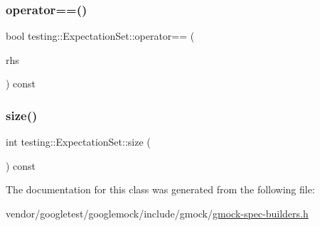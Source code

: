 \mbox{\label{classtesting_1_1_expectation_set_a0c628ffa2d255f56ca09fd739d5765db}} 
\subsubsection{\texorpdfstring{operator==()}{operator==()}}
{\footnotesize\ttfamily bool testing\+::\+Expectation\+Set\+::operator== (\begin{DoxyParamCaption}\item[{const \hyperlink{classtesting_1_1_expectation_set}{Expectation\+Set} \&}]{rhs }\end{DoxyParamCaption}) const\hspace{0.3cm}{\ttfamily [inline]}}

\mbox{\label{classtesting_1_1_expectation_set_a0941a29f03582a20c5eeabb5bf095f49}} 
\subsubsection{\texorpdfstring{size()}{size()}}
{\footnotesize\ttfamily int testing\+::\+Expectation\+Set\+::size (\begin{DoxyParamCaption}{ }\end{DoxyParamCaption}) const\hspace{0.3cm}{\ttfamily [inline]}}



The documentation for this class was generated from the following file\+:\begin{DoxyCompactItemize}
\item 
vendor/googletest/googlemock/include/gmock/\hyperlink{gmock-spec-builders_8h}{gmock-\/spec-\/builders.\+h}\end{DoxyCompactItemize}
